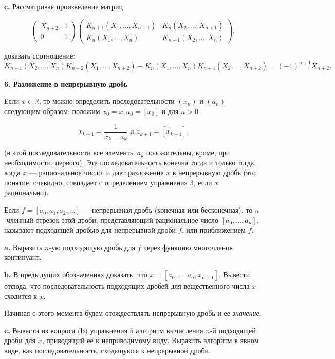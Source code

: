 \textbf{c.} Рассматривая произведение матриц

\[
\begin{pmatrix}
X_{n+2} & 1\\
0 & 1
\end{pmatrix} \begin{pmatrix}
K_{n+1}(X_1,...,X_{n+1}) & K_n(X_2,...,X_{n+1})\\
K_n(X_1,...,X_n) & K_{n-1}(X_2,...,X_n)
\end{pmatrix},
\]

\noindent доказать соотношение:
\[
K_{n-1}(X_2,...,X_n)K_{n+2}(X_1,...,X_{n+2})-K_n(X_1,...,X_n)K_{n+1}(X_2,...,X_{n+2}) = (-1)^{n+1}X_{n+2}.
\]

\pagebreak


\noindent \textbf{6. Разложение в непрерывную дробь}

Если $x \in \mathbb{R}$, то можно определить последовательности $(x_n)$ и $(a_n)$ следующим образом: положим $x_0 = x, a_0 = [x_0]$ и для $n>0$

\[
x_{k+1} = \frac{1}{x_k-a_k} \text{ и } a_{k+1} = [x_{k+1}].
\]

\noindent (в этой последовательности все элементы $a_k$ положительны, кроме,
при необходимости, первого). Эта последовательность конечна тогда
и только тогда, когда $x$ — рациональное число, и дает разложение $x$ в
непрерывную дробь (это понятие, очевидно, совпадает с определением
упражнения 3, если $x$ рационально).

Если $f = [a_0,a_1,a_2,...]$ — непрерывная дробь (конечная или 
бесконечная), то $n$-членный отрезок этой дроби, представляющий 
рациональное число $[a_0,...,a_n]$, называют подходящей дробью для непрерывной дроби $f$, или приближением $f$.

\textbf{a.} Выразить $n$-ую подходящую дробь для $f$ через функцию 
многочленов континуант.

\textbf{b.} В предыдущих обозначениях доказать, что $x = [a_0,...,a_n,x_{n+1}]$. Вывести отсюда, что последовательность подходящих дробей для 
вещественного числа $x$ сходится к $x$.

Начиная с этого момента будем отождествлять непрерывную дробь
и ее \textit{значение}.

\textbf{c.} Вывести из вопроса $\textbf{(b)}$ упражнения $5$ алгоритм вычисления $n$-й подходящей дроби для $x$, приводящий ее к неприводимому виду. Выразить алгоритм в явном виде, как последовательность, сходящуюся к
непрерывной дроби.

